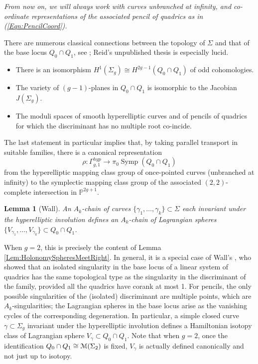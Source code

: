 \documentclass[reqno,10pt]{amsart}
\numberwithin{equation}{section}
\newcommand{\bP}{{\mathbb P}}
\newcommand{\scrM}{\EuScript{M}}
\newcommand{\Symp}{\operatorname{Symp}}
\newtheorem{Lemma}[thm]{Lemma}
\theoremstyle{remark}
\begin{document}
\emph{From now on, we will always work with curves unbranched at infinity, and co-ordinate representations of the associated pencil of quadrics as in (\ref{Eqn:PencilCoord}).}   \newline

There are numerous classical connections between the topology of $\Sigma$ and that of the base locus $Q_0 \cap Q_1$, see \cite{Reid, Wall, AL}; Reid's unpublished thesis is especially lucid. 
\begin{itemize}
\item There is an isomorphism $H^1(\Sigma_g) \cong H^{2g-1}(Q_0 \cap Q_1)$ of odd cohomologies.
\item The variety of $(g-1)$-planes in $Q_0 \cap Q_1$ is isomorphic to the Jacobian $J(\Sigma_g)$.
\item The moduli spaces of smooth hyperelliptic curves and of  pencils of quadrics for which the discriminant has no multiple root co-incide.
\end{itemize}
The last statement in particular implies that, by taking parallel transport in suitable families, there is a canonical representation
\[
\rho: \Gamma_{g,1}^{hyp} \longrightarrow \pi_0\Symp(Q_0 \cap Q_1)
\]
from the hyperelliptic mapping class group of once-pointed curves (unbranched at infinity)  to the symplectic mapping class group of the associated $(2,2)$-complete intersection in $\bP^{2g+1}$.  

\begin{Lemma}[Wall] \label{Ex:genus2}
An $A_k$-chain of curves $\{\gamma_1,\ldots, \gamma_k\} \subset \Sigma$ each invariant under the hyperelliptic involution defines an $A_k$-chain of Lagrangian spheres $\{V_{\gamma_1},\ldots, V_{\gamma_k}\} \subset Q_0 \cap Q_1$.
\end{Lemma}

When $g=2$, this is precisely the content of Lemma \ref{Lem:HolonomySpheresMeetRight}.  In general, it is a special case of Wall's \cite[Theorem 1.4]{Wall}, who showed that an isolated singularity in the base locus of a linear system of quadrics has the same topological type as the singularity in the discriminant of the family, provided all the quadrics have corank at most 1.  For pencils, the only possible singularities of the (isolated) discriminant are multiple points, which are $A_k$-singularities; the Lagrangian spheres in the base locus arise as the vanishing cycles of the corresponding degeneration.    In particular, a simple closed curve $\gamma \subset \Sigma_g$ invariant under the hyperelliptic involution defines a Hamiltonian isotopy class of Lagrangian sphere $V_{\gamma} \subset Q_0 \cap Q_1$. Note that when $g=2$, once the identification $Q_0 \cap Q_1 \cong \scrM(\Sigma_2)$ is fixed, $V_{\gamma}$ is actually defined canonically and not just up to isotopy. 
\end{document}
